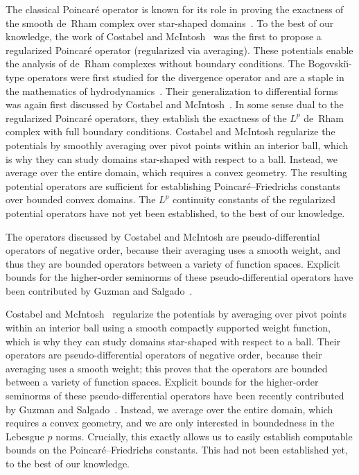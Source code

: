 \documentclass[10pt,a4paper]{article}
\newcommand{\mwl}[1]{{\color{red}#1}}
\begin{document}
\begin{remark} \label{remark:reg_Poinc_Bog}
    The classical Poincar\'e operator is known for its role in proving the exactness of the smooth de~Rham complex over star-shaped domains~\cite{lee2012smooth}.
    To the best of our knowledge, the work of Costabel and McIntosh~\cite{costabel2010bogovskiui} was the first to propose a regularized Poincar\'e operator (regularized via averaging).
    These potentials enable the analysis of de~Rham complexes without boundary conditions.
    The Bogovski\u{\i}-type operators were first studied for the divergence operator and are a staple in the mathematics of hydrodynamics~\cite{bogovskii1979solution}.
    Their generalization to differential forms was again first discussed by Costabel and McIntosh~\cite{costabel2010bogovskiui}. 
    In some sense dual to the regularized Poincar\'e operators, they establish the exactness of the $L^{p}$ de~Rham complex with full boundary conditions.
    Costabel and McIntosh regularize the potentials by smoothly averaging over pivot points within an interior ball, 
    which is why they can study domains star-shaped with respect to a ball. 
    Instead, we average over the entire domain, which requires a convex geometry. 
    The resulting potential operators are sufficient for establishing Poincar\'e--Friedrichs constants over bounded convex domains. 
    The $L^{p}$ continuity constants of the regularized potential operators have not yet been established, to the best of our knowledge.
    
    The operators discussed by Costabel and McIntosh are pseudo-differential operators of negative order, 
    because their averaging uses a smooth weight, and thus they are bounded operators between a variety of function spaces. 
    Explicit bounds for the higher-order seminorms of these pseudo-differential operators 
    have been contributed by Guzman and Salgado~\cite{guzman2021estimation}. %
    
    \mwl{ 
    Costabel and McIntosh~\cite{costabel2010bogovskiui} regularize the potentials by averaging over pivot points within an interior ball using a smooth compactly supported weight function, 
    which is why they can study domains star-shaped with respect to a ball. 
    Their operators are pseudo-differential operators of negative order, 
    because their averaging uses a smooth weight; this proves that the operators are bounded between a variety of function spaces. 
    Explicit bounds for the higher-order seminorms of these pseudo-differential operators 
    have been recently contributed by Guzman and Salgado~\cite{guzman2021estimation}. 
    Instead, we average over the entire domain, which requires a convex geometry, and we are only interested in boundedness in the Lebesgue $p$ norms. 
    Crucially, this exactly allows us to easily establish computable bounds on the Poincar\'e--Friedrichs constants.   
    This had not been established yet, to the best of our knowledge. 
    }
\end{remark}
\end{document}
